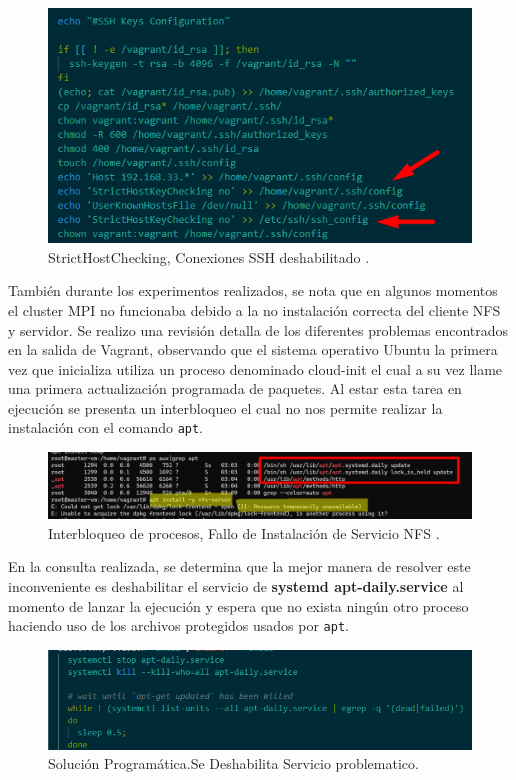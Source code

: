 \documentclass[letterpaper, 12pt, oneside]{article}
\begin{document}
    \begin{figure}[H]\centering
            \includegraphics[scale=1.4]{img/provision/checkeodessh.png}
            \caption{StrictHostChecking, Conexiones SSH deshabilitado .}
            \label{fig:checkssh}
    \end{figure}
    También durante los experimentos realizados, se nota que en algunos momentos el cluster MPI no funcionaba debido a la no instalación correcta del cliente NFS y servidor. Se realizo una revisión detalla de los diferentes problemas encontrados en la salida de Vagrant, observando que el sistema operativo Ubuntu la primera vez que inicializa utiliza un proceso denominado cloud-init el cual a su vez llame una primera actualización programada de paquetes. Al estar esta tarea en ejecución se presenta un interbloqueo el cual no nos permite realizar la instalación con el comando \texttt{apt}. 
    \begin{figure}[H]\centering
            \includegraphics[scale=1.2]{img/provision/problemaapt.png}
            \caption{Interbloqueo de procesos, Fallo de Instalación de Servicio NFS .}
            \label{fig:checkssh}
    \end{figure}
    En la consulta realizada, se determina que la mejor manera de resolver este inconveniente es deshabilitar el servicio de \textbf{systemd apt-daily.service} al momento de lanzar la ejecución y espera que no exista ningún otro proceso haciendo uso de los archivos protegidos usados por \texttt{apt}.
    \begin{figure}[H]\centering
            \includegraphics[scale=1.4]{img/provision/problemaapt1.png}
            \caption{Solución Programática.Se Deshabilita Servicio problematico.}
            \label{fig:checkssh}
    \end{figure}
    
\end{document}
